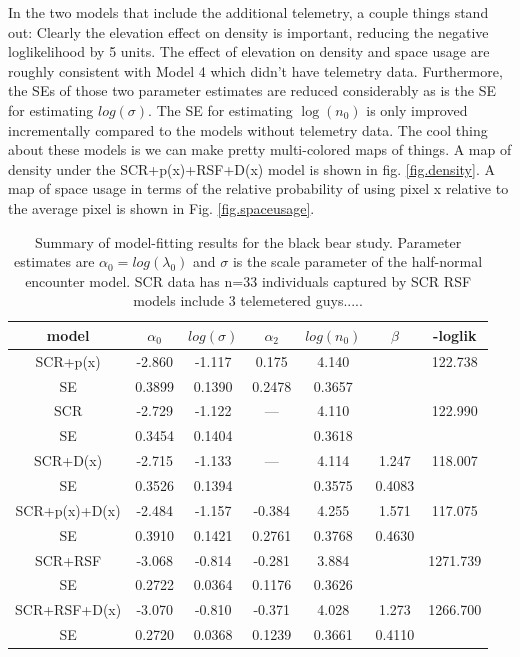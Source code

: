 \documentclass[12pt]{article}
\begin{document}
In the two models that include the additional telemetry, a couple
things stand out: Clearly the elevation effect on density is
important, reducing the negative loglikelihood by 5 units. The effect
of elevation on density and space usage are roughly consistent with
Model 4 which didn't have telemetry data. Furthermore, the SEs of
those two parameter estimates are reduced considerably as is the SE
for estimating $log(\sigma)$.  The SE for estimating $\log(n_{0})$ is
only improved incrementally compared to the models without telemetry
data.  The cool thing about these models is we can make pretty
multi-colored maps of things.  A map of density under the SCR+p(x)+RSF+D(x)
model is shown in fig. \ref{fig.density}.  A map of space usage in
terms of the relative probability of using pixel x relative to the
average pixel is shown in Fig. \ref{fig.spaceusage}.

\begin{table}
\centering
\caption{
Summary of model-fitting results for the black bear study. Parameter
estimates are $\alpha_{0} = log(\lambda_{0})$ and $\sigma$ is the
scale parameter of the half-normal encounter model.
SCR data has n=33 individuals captured by SCR
RSF models include 
3 telemetered guys.....
}
\begin{tabular}{c|cccccc}
\hline \hline
model & $\alpha_0$ & $log(\sigma)$ & $\alpha_{2}$ & $log(n_{0})$ &
$\beta$ & -loglik \\ \hline
SCR+p(x)     & -2.860  & -1.117  &  0.175 &  4.140   &        &122.738  \\
   SE        &  0.3899 &  0.1390 &  0.2478&  0.3657  &        & \\
 SCR         & -2.729  &  -1.122 &  ---&  4.110   &        &              122.990   \\
   SE        &  0.3454 &   0.1404&        &  0.3618  &        &       \\
SCR+D(x)     & -2.715  & -1.133  &  ---  &  4.114   & 1.247  &   118.007  \\
   SE        &  0.3526 & 0.1394  &        &  0.3575  & 0.4083 &       \\
SCR+p(x)+D(x)& -2.484  & -1.157  &-0.384  &  4.255   & 1.571  &      117.075 \\
   SE        &  0.3910 &  0.1421 & 0.2761 &  0.3768  & 0.4630 & \\
SCR+RSF    &   -3.068  & -0.814  &-0.281  &  3.884   &        &   1271.739 \\
   SE      &    0.2722 &  0.0364 & 0.1176 &  0.3626  &        & \\
SCR+RSF+D(x)&  -3.070  &-0.810   &-0.371  &  4.028   & 1.273  &   1266.700 \\
   SE       &   0.2720 & 0.0368  & 0.1239 &  0.3661  & 0.4110 &    \\
\end{tabular}
\label{tab.nyresults}
\end{table}
\end{document}

